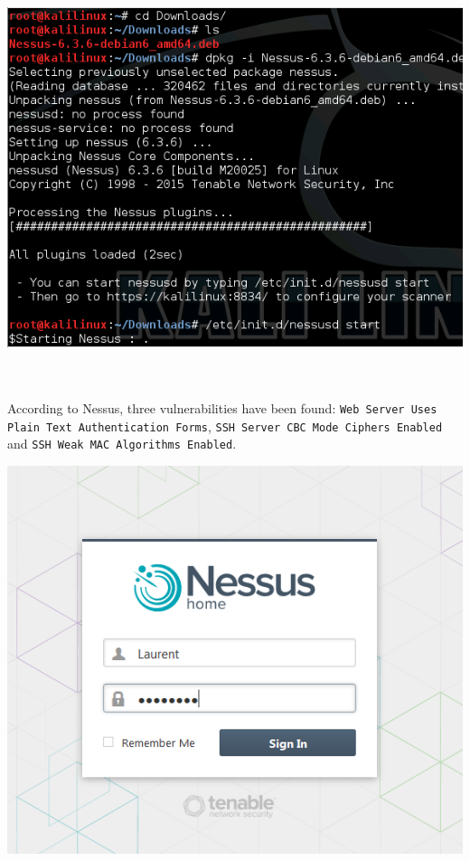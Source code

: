 \documentclass[11pt, a4paper]{article}
\begin{document}
\noindent\begin{minipage}{\textwidth}
    \centering
    \includegraphics{Nessus_0.png}
\end{minipage}
$\;$ \\ \\
According to Nessus, three vulnerabilities have been found: \texttt{Web Server Uses Plain Text Authentication Forms}, \texttt{SSH Server CBC Mode Ciphers Enabled} and \texttt{SSH Weak MAC Algorithms Enabled}.
\noindent\begin{minipage}{\textwidth}
    \centering
    \includegraphics{Nessus_1.png}
\end{minipage}
\end{document}
